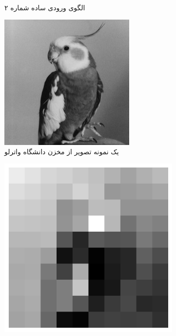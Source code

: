 \begin{figure}[!ht]
\begin{adjustbox}{minipage=\linewidth,scale=0.4}
\begin{subfigure}[b]{0.4\textwidth}
                    \caption{الگوی ورودی ساده شماره ۲}
                    \label{fig:simple-pattern2}
                \end{subfigure}
                \vfill
                \begin{subfigure}[b]{0.4\textwidth}
                    \centering
                    \includegraphics[width=\textwidth]{images/bird.jpg}
                    \caption{یک نمونه تصویر از مخزن دانشگاه واترلو}
                    \label{fig:waterloo-sample-original}
                \end{subfigure}
                \hfill
                \begin{subfigure}[b]{0.4\textwidth}
                    \centering
                    \includegraphics[width=\textwidth]{images/bird-resized.jpg}

\end{subfigure}
\end{adjustbox}
\end{figure}
